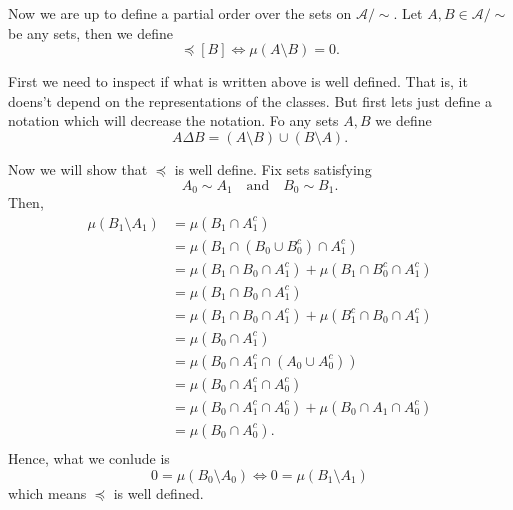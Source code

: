 \documentclass[11pt,twoside,a4paper]{article}
\begin{document}
Now we are up to define a partial order over the sets on $\mathcal{A}/\sim$.  
Let $A, B \in \mathcal{A}/\sim$ be any sets, then we define
\begin{equation*}
    [A] \preceq [B] \iff \mu (A \setminus B ) = 0.
\end{equation*}

First we need to inspect if what is written above is well defined. 
That is, it doens't depend on the representations of the classes.
But first lets just define a notation which will decrease the notation.
Fo any sets $A,B$ we define
\begin{equation*}
    A \Delta B = (A \setminus B) \cup (B \setminus A).
\end{equation*}

Now we will show that $\preceq$ is well define.  
Fix sets satisfying
\begin{equation*}
    A_0 \sim A_1 \quad \text{and} \quad B_0 \sim B_1.
\end{equation*}
Then,
\begin{align*}
    \mu(B_1 \setminus A_1)
        & =
        \mu(B_1 \cap A_1^c) \\
        & =
        \mu(B_1 \cap (B_0 \cup B_0^c) \cap A_1^c) \\
        & =
        \mu(B_1 \cap B_0 \cap A_1^c) + 
        \mu(B_1 \cap B_0^c \cap A_1^c) \\
        & =
        \mu(B_1 \cap B_0 \cap A_1^c) \\
        & =
        \mu(B_1 \cap B_0 \cap A_1^c) +
        \mu(B_1^c \cap B_0 \cap A_1^c)   \\
        & =
        \mu(B_0 \cap A_1^c)  \\
        & =
        \mu(B_0 \cap A_1^c \cap (A_0 \cup A_0^c))  \\
        & =
        \mu(B_0 \cap A_1^c \cap A_0^c) \\
        & =
        \mu(B_0 \cap A_1^c \cap A_0^c) +
        \mu(B_0 \cap A_1  \cap A_0^c)  \\
        & =
        \mu(B_0 \cap A_0^c).\\
\end{align*}
Hence, what we conlude is
\begin{equation*}
    0 = \mu(B_0 \setminus A_0) \iff 0 = \mu(B_1 \setminus A_1)
\end{equation*}
which means $\preceq$ is well defined.  
\end{document}
